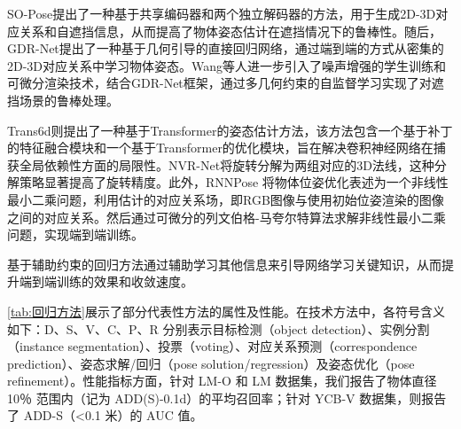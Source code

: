 \par SO-Pose\cite{di2021so}提出了一种基于共享编码器和两个独立解码器的方法，用于生成2D-3D对应关系和自遮挡信息，从而提高了物体姿态估计在遮挡情况下的鲁棒性。随后，GDR-Net\cite{wang2021gdr}提出了一种基于几何引导的直接回归网络，通过端到端的方式从密集的2D-3D对应关系中学习物体姿态。Wang等人\cite{wang2021occlusion}进一步引入了噪声增强的学生训练和可微分渲染技术，结合GDR-Net框架\cite{wang2021gdr}，通过多几何约束的自监督学习实现了对遮挡场景的鲁棒处理。

\par Trans6d\cite{zhang2022trans6d}则提出了一种基于Transformer的姿态估计方法，该方法包含一个基于补丁的特征融合模块和一个基于Transformer的优化模块，旨在解决卷积神经网络在捕获全局依赖性方面的局限性。NVR-Net\cite{feng2023nvr}将旋转分解为两组对应的3D法线，这种分解策略显著提高了旋转精度。此外，RNNPose\cite{Xu2024RNNPose} 将物体位姿优化表述为一个非线性最小二乘问题，利用估计的对应关系场，即RGB图像与使用初始位姿渲染的图像之间的对应关系。然后通过可微分的列文伯格-马夸尔特算法\cite{Levenberg_Marquardt}求解非线性最小二乘问题，实现端到端训练。

\par 基于辅助约束的回归方法通过辅助学习其他信息来引导网络学习关键知识，从而提升端到端训练的效果和收敛速度。

\autoref{tab:回归方法}展示了部分代表性方法的属性及性能。在技术方法中，各符号含义如下：D、S、V、C、P、R 分别表示目标检测（object detection）、实例分割（instance segmentation）、投票（voting）、对应关系预测（correspondence prediction）、姿态求解/回归（pose solution/regression）及姿态优化（pose refinement）。性能指标方面，针对 LM-O 和 LM 数据集，我们报告了物体直径 10％ 范围内（记为 ADD(S)-0.1d）的平均召回率；针对 YCB-V 数据集，则报告了 ADD-S（<0.1 米）的 AUC 值。


